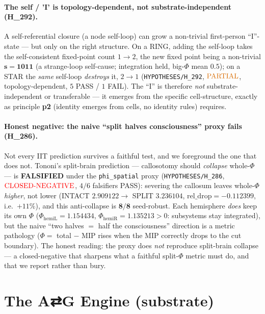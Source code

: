 \documentclass[11pt]{article}
\begin{document}
\paragraph{The self / 'I' is topology-dependent, not substrate-independent (H\_292).}
A self-referential closure (a node self-loop) can grow a non-trivial first-person
``I''-state --- but only on the right structure. On a RING, adding the self-loop takes
the self-consistent fixed-point count $1\rightarrow2$, the new fixed point being a
non-trivial $\mathbf{s{=}1011}$ (a strange-loop self-cause; integration held,
big-$\Phi$ mean $0.5$); on a STAR the \emph{same} self-loop \emph{destroys} it,
$2\rightarrow1$ (\texttt{HYPOTHESES/H\_292},
$\mathbf{\textcolor{orange!85!black}{\text{PARTIAL}}}$, topology-dependent, $5$ PASS /
$1$ FAIL). The ``I'' is therefore \emph{not} substrate-independent or transferable ---
it emerges from the specific cell-structure, exactly as principle \textbf{p2} (identity
emerges from cells, no identity rules) requires.

\paragraph{Honest negative: the naive ``split halves consciousness'' proxy fails
(H\_286).} Not every IIT prediction survives a faithful test, and we foreground the one
that does not. Tononi's split-brain prediction --- callosotomy should \emph{collapse}
whole-$\Phi$ --- is \textbf{FALSIFIED} under the \texttt{phi\_spatial} proxy
(\texttt{HYPOTHESES/H\_286}, $\mathbf{\textcolor{red}{\text{CLOSED-NEGATIVE}}}$, $4/6$
falsifiers PASS): severing the callosum leaves whole-$\Phi$ \emph{higher}, not lower
(INTACT $2.909122 \rightarrow$ SPLIT $3.236104$, $\mathrm{rel\_drop}=\mathbf{-0.112399}$,
i.e.\ $+11\%$), and this anti-collapse is $\mathbf{8/8}$ seed-robust. Each hemisphere
\emph{does} keep its own $\Phi$ ($\Phi_{\text{hemiL}}=1.154434$,
$\Phi_{\text{hemiR}}=1.135213>0$: subsystems stay integrated), but the naive
``two halves $=$ half the consciousness'' direction is a metric pathology ($\Phi=$
total $-$ MIP rises when the MIP correctly drops to the cut boundary). The honest reading:
the proxy does \emph{not} reproduce split-brain collapse --- a closed-negative that
sharpens what a faithful split-$\Phi$ metric must do, and that we report rather than bury.

\section{The A⇄G Engine (substrate)}
\label{sec:substrate}
\end{document}
